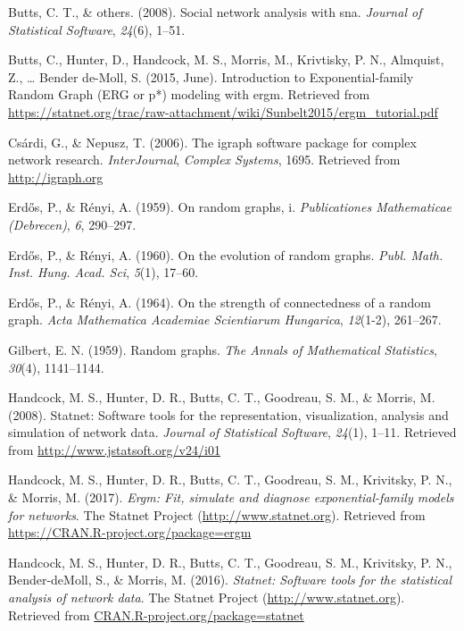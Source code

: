 \documentclass[12pt,twoside]{amherstthesis}
\begin{document}
  \hypertarget{ref-butts2008social}{}
  Butts, C. T., \& others. (2008). Social network analysis with sna.
  \emph{Journal of Statistical Software}, \emph{24}(6), 1--51.
  
  \hypertarget{ref-butts_introduction_2015}{}
  Butts, C., Hunter, D., Handcock, M. S., Morris, M., Krivtisky, P. N.,
  Almquist, Z., \ldots{} Bender de-Moll, S. (2015, June). Introduction to
  Exponential-family Random Graph (ERG or p*) modeling with ergm.
  Retrieved from
  \url{https://statnet.org/trac/raw-attachment/wiki/Sunbelt2015/ergm_tutorial.pdf}
  
  \hypertarget{ref-igraphpackage}{}
  Csárdi, G., \& Nepusz, T. (2006). The igraph software package for
  complex network research. \emph{InterJournal}, \emph{Complex Systems},
  1695. Retrieved from \url{http://igraph.org}
  
  \hypertarget{ref-erdos1959random}{}
  Erd\H{o}s, P., \& Rényi, A. (1959). On random graphs, i.
  \emph{Publicationes Mathematicae (Debrecen)}, \emph{6}, 290--297.
  
  \hypertarget{ref-erdos1960evolution}{}
  Erd\H{o}s, P., \& Rényi, A. (1960). On the evolution of random graphs.
  \emph{Publ. Math. Inst. Hung. Acad. Sci}, \emph{5}(1), 17--60.
  
  \hypertarget{ref-erdHos1964strength}{}
  Erd\H{o}s, P., \& Rényi, A. (1964). On the strength of connectedness of
  a random graph. \emph{Acta Mathematica Academiae Scientiarum Hungarica},
  \emph{12}(1-2), 261--267.
  
  \hypertarget{ref-gilbert1959random}{}
  Gilbert, E. N. (1959). Random graphs. \emph{The Annals of Mathematical
  Statistics}, \emph{30}(4), 1141--1144.
  
  \hypertarget{ref-statnetpackagearticle}{}
  Handcock, M. S., Hunter, D. R., Butts, C. T., Goodreau, S. M., \&
  Morris, M. (2008). Statnet: Software tools for the representation,
  visualization, analysis and simulation of network data. \emph{Journal of
  Statistical Software}, \emph{24}(1), 1--11. Retrieved from
  \url{http://www.jstatsoft.org/v24/i01}
  
  \hypertarget{ref-ergmpackagemanual}{}
  Handcock, M. S., Hunter, D. R., Butts, C. T., Goodreau, S. M.,
  Krivitsky, P. N., \& Morris, M. (2017). \emph{Ergm: Fit, simulate and
  diagnose exponential-family models for networks}. The Statnet Project
  (\url{http://www.statnet.org}). Retrieved from
  \url{https://CRAN.R-project.org/package=ergm}
  
  \hypertarget{ref-statnetpackagemanual}{}
  Handcock, M. S., Hunter, D. R., Butts, C. T., Goodreau, S. M.,
  Krivitsky, P. N., Bender-deMoll, S., \& Morris, M. (2016).
  \emph{Statnet: Software tools for the statistical analysis of network
  data}. The Statnet Project (\url{http://www.statnet.org}). Retrieved
  from \url{CRAN.R-project.org/package=statnet}
  
\end{document}
